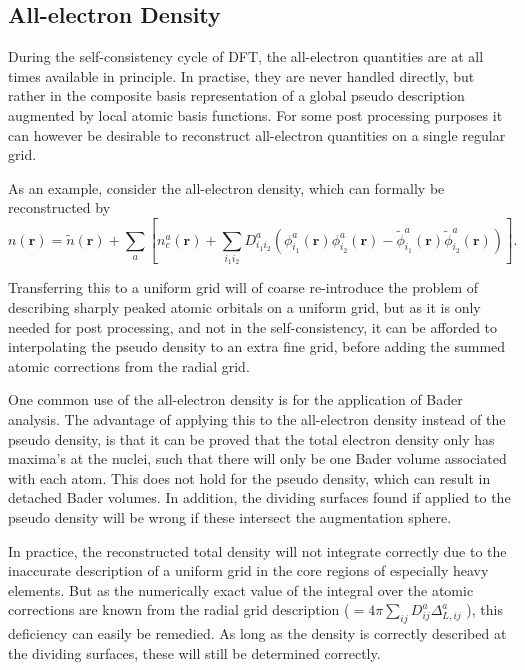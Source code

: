 \documentclass[a4paper]{article}
\newcommand{\s}[1]{\tilde{#1}}
\newcommand{\br}{\mathbf{r}}
\begin{document}
\subsection{All-electron Density}
During the self-consistency cycle of DFT, the all-electron quantities
are at all times available in principle. In practise, they are never
handled directly, but rather in the composite basis representation of
a global pseudo description augmented by local atomic basis functions.
For some post processing purposes it can however be desirable to
reconstruct all-electron quantities on a single regular grid.

As an example, consider the all-electron density, which can formally
be reconstructed by
\begin{equation*}
  n(\br) = \tilde{n}(\br) + \sum_a \left[ n_c^a(\br) + \sum_{i_1i_2} D_{i_1i_2}^a \left( \phi_{i_1}^a(\br)\phi_{i_2}^a(\br) - \s{\phi}_{i_1}^a(\br)\s{\phi}_{i_2}^a(\br) \right)\right].
\end{equation*}

Transferring this to a uniform grid will of coarse re-introduce the
problem of describing sharply peaked atomic orbitals on a uniform
grid, but as it is only needed for post processing, and not in the
self-consistency, it can be afforded to interpolating the pseudo
density to an extra fine grid, before adding the summed atomic
corrections from the radial grid.

One common use of the all-electron density is for the application of
Bader analysis\cite{Tang2009}. The advantage of applying this to the
all-electron density instead of the pseudo density, is that it can be
proved that the total electron density only has maxima's at the nuclei,
such that there will only be one Bader volume associated with each
atom. This does not hold for the pseudo density, which can result in
detached Bader volumes. In addition, the dividing surfaces found if applied to the pseudo density will be wrong if these intersect the augmentation sphere.

In practice, the reconstructed total density will not integrate
correctly due to the inaccurate description of a uniform grid in the
core regions of especially heavy elements. But as the numerically
exact value of the integral over the atomic corrections are known from
the radial grid description ($=4\pi\sum_{ij}D^a_{ij} \Delta^a_{L, ij}$
), this deficiency can easily be remedied. As long as the density is
correctly described at the dividing surfaces, these will still be
determined correctly.
\end{document}
